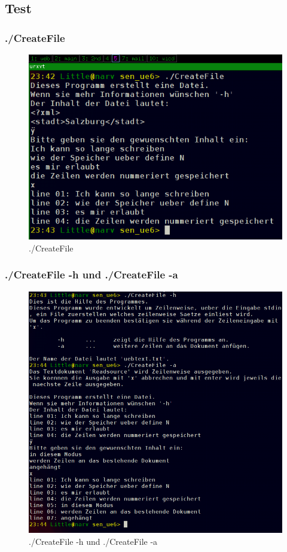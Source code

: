 \documentclass{scrartcl}
\begin{document}
\subsection{Test}
\subsubsection{./CreateFile}
\begin{figure}[H]
  \centering
  \includegraphics[width=0.9\linewidth]{images/Test_CreateFile.png}
  \caption{./CreateFile}
  \label{fig:digraph}
\end{figure}
\subsubsection{./CreateFile -h und ./CreateFile -a}
\begin{figure}[H]
  \centering
  \includegraphics[width=0.9\linewidth]{images/Test_CreatFile_a.png}
  \caption{./CreateFile -h und ./CreateFile -a}
  \label{fig:digraph}
\end{figure}
\end{document}
